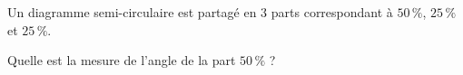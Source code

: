 
Un diagramme semi-circulaire est partagé en $3$ parts correspondant à $50\,\%$, $25\,\%$ et $25\,\%$.

Quelle est la mesure de l'angle de la part $50\,\%$ ?

\smallskip
{}
